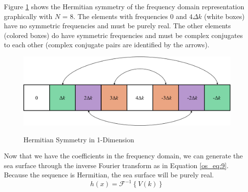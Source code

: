 Figure \ref{os_fig:6ab} shows the Hermitian symmetry of the frequency domain representation graphically with $N$ = 8. The elements with frequencies $0$ and $4\Delta k$ (white boxes) have no symmetric frequencies and must be purely real. The other elements (colored boxes) do have symmetric frequencies and must be complex conjugates to each other (complex conjugate pairs are identified by the arrows).
\begin{figure}[H]
  \begin{center}
\includegraphics[width=5in]{../media/Ocean_Surface/1-d_hermitian_symmetry.png}
  \end{center}
  \renewcommand{\baselinestretch}{1} \small\normalsize
  \begin{quote}
    \caption[Hermitian Symmetry in 1-Dimension]{Hermitian Symmetry in 1-Dimension\label{os_fig:6ab}}
  \end{quote}
\end{figure}
\renewcommand{\baselinestretch}{2} \small\normalsize
Now that we have the coefficients in the frequency domain, we can generate the sea surface through the inverse Fourier transform as in Equation \ref{os_eq:9}. Because the sequence is Hermitian, the sea surface will be purely real.
\begin{equation}
  \label{os_eq:9}
  h(x) = \mathcal{F}^{-1}\left\{V(k) \right\}
  \end{equation}

